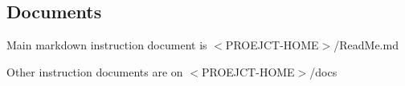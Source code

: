 \subsection*{Documents}


\begin{DoxyItemize}
\item Main markdown instruction document is $<$P\+R\+O\+E\+J\+C\+T-\/\+H\+O\+ME$>$/\+Read\+Me.md
\item Other instruction documents are on $<$P\+R\+O\+E\+J\+C\+T-\/\+H\+O\+ME$>$/docs 
\end{DoxyItemize}